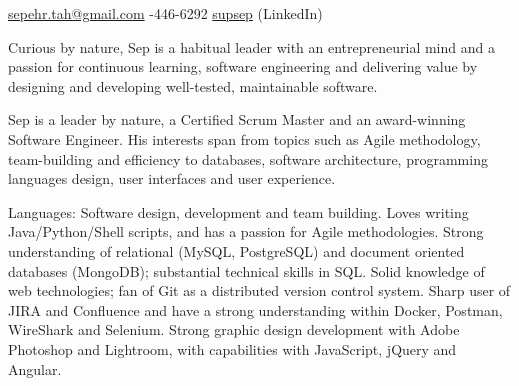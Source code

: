 \documentclass[10pt,a4paper]{article}
\begin{document}
\sloppy  %


\nobreakvspace{0.3em}  %

\noindent\href{mailto:sepehr.tah.at.gmail.dot.com}{sepehr.tah\mbox{}@\mbox{}gmail.com}\sbull
{}-446-6292\sbull
\href{http://www.linkedin.com/in/supsep}{supsep} (LinkedIn)


\spacedhrule{0.9em}{-0.4em}  %


\vspace{-1.3em}  %
\begin{multicols}{2}  %
Curious by nature, Sep is a habitual leader with an entrepreneurial
mind and a passion for continuous learning, software engineering and delivering value
by designing and developing well-tested, maintainable software.

Sep is a leader by nature, a Certified Scrum Master and an award-winning Software Engineer. His interests span from topics such as Agile methodology, team-building and efficiency to databases, software architecture, programming languages design, user interfaces and user experience.

\end{multicols}

\spacedhrule{0.5em}{-0.4em}

\inlineheadsection  %
  {Languages:}
  {Software design, development and team building. Loves writing 
Java/\nsp Python/\nsp Shell scripts, and has a passion for Agile methodologies. Strong understanding of relational
(MySQL, PostgreSQL) and document oriented databases (MongoDB); substantial technical skills in SQL. Solid knowledge of web technologies; fan of Git as a distributed version control system. Sharp user of JIRA and Confluence and have a strong understanding within Docker, Postman, WireShark and Selenium. Strong graphic design development with Adobe Photoshop and Lightroom, with capabilities with JavaScript, jQuery and Angular.}
\end{document}
